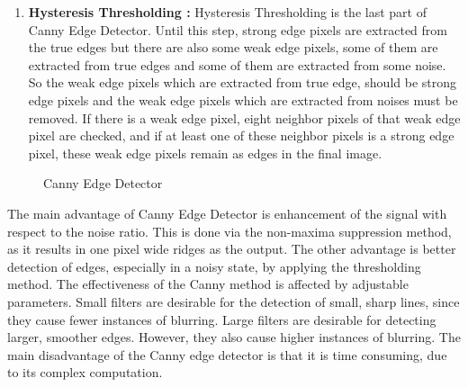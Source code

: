 \begin{enumerate}
\item \textbf{Hysteresis Thresholding : } Hysteresis Thresholding is the last part of Canny Edge Detector. Until this step, strong edge pixels are extracted from the true edges but there are also some weak edge pixels, some of them are extracted from true edges and some of them are extracted from some noise. So the weak edge pixels which are extracted from true edge, should be strong edge pixels and the weak edge pixels which are extracted from noises must be removed. If there is a weak edge pixel, eight neighbor pixels of that weak edge pixel are checked, and if at least one of these neighbor pixels is a strong edge pixel, these weak edge pixels remain as edges in the final image. 

\end{enumerate}


\begin{figure}[H]
  \centering
  \hfill
  \caption{Canny Edge Detector\cite{Canny_Edge_Detector}}
\end{figure} 



The main advantage of Canny Edge Detector is enhancement of the signal with respect to the noise ratio. This is done via the non-maxima suppression method, as it results in one pixel wide ridges as the output. The other advantage is better detection of edges, especially in a noisy state, by applying the thresholding method. The effectiveness of the Canny method is affected by adjustable parameters. Small filters are desirable for the detection of small, sharp lines, since they cause fewer instances of blurring. Large filters are desirable for detecting larger, smoother edges. However, they also cause higher instances of blurring. 
The main disadvantage of the Canny edge detector is that it is time consuming, due to its complex computation.



